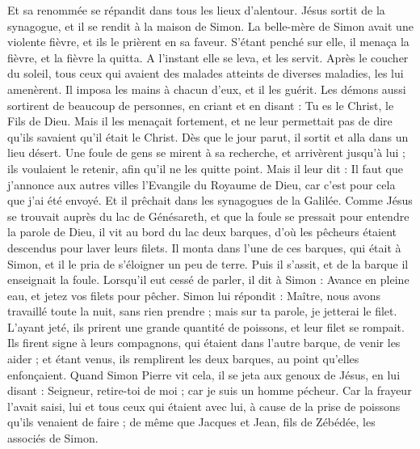 \begin{multicols}{2}
Et sa renommée se répandit dans tous les lieux d'alentour.
Jésus sortit de la synagogue, et il se rendit à la maison de Simon. La belle-mère de Simon avait une violente fièvre, et ils le prièrent en sa faveur.
S'étant penché sur elle, il menaça la fièvre, et la fièvre la quitta. A l’instant elle se leva, et les servit.
Après le coucher du soleil, tous ceux qui avaient des malades atteints de diverses maladies, les lui amenèrent. Il imposa les mains à chacun d'eux, et il les guérit.
Les démons aussi sortirent de beaucoup de personnes, en criant et en disant : Tu es le Christ, le Fils de Dieu. Mais il les menaçait fortement, et ne leur permettait pas de dire qu'ils savaient qu'il était le Christ.
Dès que le jour parut, il sortit et alla dans un lieu désert. Une foule de gens se mirent à sa recherche, et arrivèrent jusqu’à lui ; ils voulaient le retenir, afin qu’il ne les quitte point.
Mais il leur dit : Il faut que j’annonce aux autres villes l’Evangile du Royaume de Dieu, car c’est pour cela que j’ai été envoyé.
Et il prêchait dans les synagogues de la Galilée.
\VerseOne{}Comme Jésus se trouvait auprès du lac de Génésareth, et que la foule se pressait pour entendre la parole de Dieu,
il vit au bord du lac deux barques, d’où les pêcheurs étaient descendus pour laver leurs filets.
Il monta dans l'une de ces barques, qui était à Simon, et il le pria de s’éloigner un peu de terre. Puis il s’assit, et de la barque il enseignait la foule.
Lorsqu’il eut cessé de parler, il dit à Simon : Avance en pleine eau, et jetez vos filets pour pêcher.
Simon lui répondit : Maître, nous avons travaillé toute la nuit, sans rien prendre ; mais sur ta parole, je jetterai le filet.
L’ayant jeté, ils prirent une grande quantité de poissons, et leur filet se rompait.
Ils firent signe à leurs compagnons, qui étaient dans l'autre barque, de venir les aider ; et étant venus, ils remplirent les deux barques, au point qu'elles enfonçaient.
Quand Simon Pierre vit cela, il se jeta aux genoux de Jésus, en lui disant : Seigneur, retire-toi de moi ; car je suis un homme pécheur.
Car la frayeur l'avait saisi, lui et tous ceux qui étaient avec lui, à cause de la prise de poissons qu'ils venaient de faire ; de même que Jacques et Jean, fils de Zébédée, les associés de Simon.

\end{multicols}
